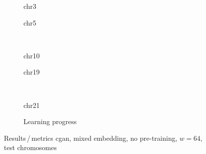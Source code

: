 \begin{figure}[p] %
    \begin{subfigure}{0.45\textwidth}
        \scriptsize
        \caption{chr3}
    \end{subfigure} \hfill
    \begin{subfigure}{0.45\textwidth}
        \scriptsize
        \caption{chr5}
    \end{subfigure}\\[5mm]
    \begin{subfigure}{0.45\textwidth}
        \scriptsize
        \caption{chr10}
    \end{subfigure}\hfill
    \begin{subfigure}{0.45\textwidth}
        \scriptsize
        \caption{chr19}
    \end{subfigure}\\[3mm]
    \centering
    \begin{subfigure}{0.45\textwidth}
        \scriptsize
        \caption{chr21}
    \end{subfigure} \hfill
    \begin{subfigure}{0.45\textwidth}
        \scriptsize
        \caption{Learning progress} \label{fig:results:GAN64_mixed_lossEpochs}
    \end{subfigure}
    \caption{Results\,/\,metrics \acrshort{cgan}, mixed embedding, no pre-training, $w=64$, test chromosomes}   \label{fig:results:GAN64_mixed_pearson}
\end{figure}
